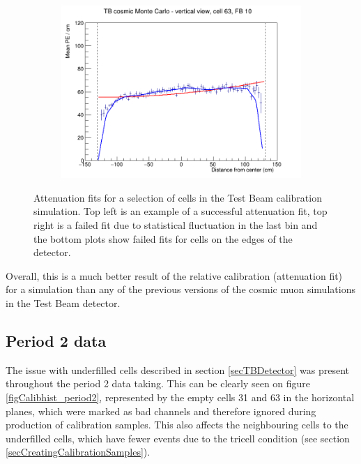\documentclass[12pt,a4paper]{article}
\begin{document}
\begin{figure}[h]
\begin{subfigure}{0.5\textwidth}
  \end{subfigure}
  \begin{subfigure}{0.5\textwidth}
    \includegraphics[width=\linewidth]{RelativeCalibrationResults/sim_fb10_000_063.png}
  \end{subfigure}
  \caption{Attenuation fits for a selection of cells in the Test Beam calibration simulation. Top left is an example of a successful attenuation fit, top right is a failed fit due to statistical fluctuation in the last bin and the bottom plots show failed fits for cells on the edges of the detector.}
  \label{figAttenfitResultsSimulation}
\end{figure}

Overall, this is a much better result of the relative calibration (attenuation fit) for a simulation than any of the previous versions of the cosmic muon simulations in the Test Beam detector.

\FloatBarrier
\subsection{Period 2 data}
The issue with underfilled cells described in section \ref{secTBDetector} was present throughout the period 2 data taking. This can be clearly seen on figure \ref{figCalibhist_period2}, represented by the empty cells 31 and 63 in the horizontal planes, which were marked as bad channels and therefore ignored during production of calibration samples. This also affects the neighbouring cells to the underfilled cells, which have fewer events due to the tricell condition (see section \ref{secCreatingCalibrationSamples}).
\end{document}

